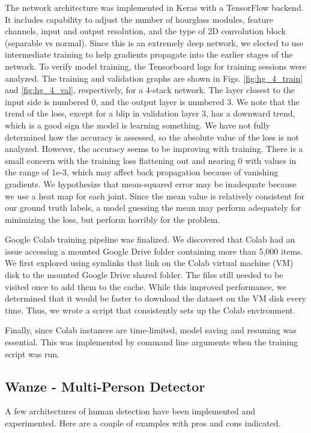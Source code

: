 \documentclass[11pt, letterpaper]{article}
\begin{document}
The network architecture was implemented in Keras with a TensorFlow backend. It includes capability to adjust the number of hourglass modules, feature channels, input and output resolution, and the type of 2D convolution block (separable vs normal). Since this is an extremely deep network, we elected to use intermediate training to help gradients propagate into the earlier stages of the network. To verify model training, the Tensorboard logs for training sessions were analyzed. The training and validation graphs are shown in Figs. \ref{fig:hg_4_train} and \ref{fig:hg_4_val}, respectively, for a 4-stack network. The layer closest to the input side is numbered 0, and the output layer is numbered 3. We note that the trend of the loss, except for a blip in validation layer 3, has a downward trend, which is a good sign the model is learning something. We have not fully determined how the accuracy is assessed, so the absolute value of the loss is not analyzed. However, the accuracy seems to be improving with training. There is a small concern with the training loss flattening out and nearing 0 with values in the range of 1e-3, which may affect back propagation because of vanishing gradients. We hypothesize that mean-squared error may be inadequate because we use a heat map for each joint. Since the mean value is relatively consistent for our ground truth labels, a model guessing the mean may perform adequately for minimizing the loss, but perform horribly for the problem.

Google Colab training pipeline was finalized. We discovered that Colab had an issue accessing a mounted Google Drive folder containing more than 5,000 items. We first explored using symlinks that link on the Colab virtual machine (VM) disk to the mounted Google Drive shared folder. The files still needed to be visited once to add them to the cache. While this improved performance, we determined that it would be faster to download the dataset on the VM disk every time. Thus, we wrote a script that consistently sets up the Colab environment.

Finally, since Colab instances are time-limited, model saving and resuming was essential. This was implemented by command line arguments when the training script was run.


\subsection{Wanze - Multi-Person Detector}
A few architectures of human detection have been implemented and experimented. Here are a couple of examples with pros and cons indicated. 
\end{document}
